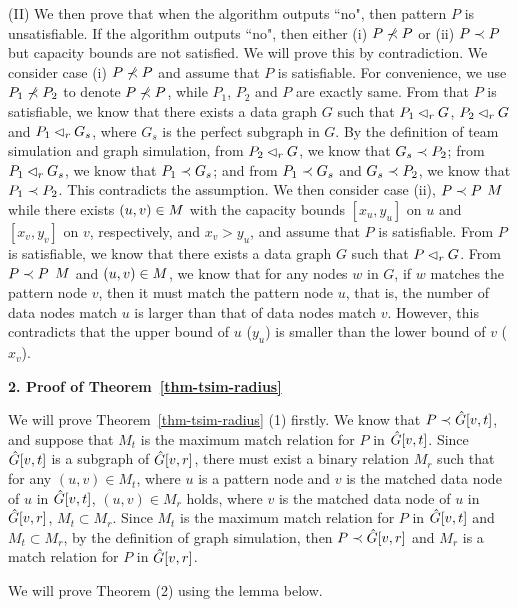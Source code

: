 \vspace{-1.5ex}
(II) We then prove that when the algorithm outputs ``no", then pattern $P$ is unsatisfiable.
If the algorithm outputs ``no", then either (i) $P \not\prec P$ or (ii) $P \prec P$ but capacity bounds are not satisfied.
We will prove this by contradiction.
We consider case (i) $P \not\prec P$ and assume that $P$ is satisfiable.
For convenience, we use $P_1 \not\prec P_2$ to denote $P \not\prec P$, while $P_1$, $P_2$ and $P$ are exactly same.
From that $P$ is satisfiable, we know that there exists a data graph $G$ such that $P_1 \lhd_r G$, $P_2 \lhd_r G$ and $P_1 \lhd_r G_s$, where $G_s$ is the perfect subgraph in $G$.
By the definition of team simulation and graph simulation, from $P_2 \lhd_r G$, we know that $G_s \prec P_2$;
from $P_1 \lhd_r G_s$, we know that $P_1 \prec G_s$; and 
from $P_1 \prec G_s$ and  $G_s \prec P_2$, we know that $P_1 \prec P_2$.
This contradicts the assumption.
We then consider case (ii), $P \prec P$ \wrt $M$ while there exists $(u, v)\in M$ with the capacity bounds $[x_u, y_u]$ on $u$ and $[x_v, y_v]$ on $v$, respectively, and $x_v > y_u$, and assume that $P$ is satisfiable.
From $P$ is satisfiable, we know that there exists a data graph $G$ such that $P \lhd_r G$.
From $P \prec P$ \wrt $M$ and $(u, v)\in M$, we know that for any nodes $w$ in $G$, if $w$ matches the pattern node $v$, then it must match the pattern node $u$, that is, the number of data nodes match $u$ is larger than that of data nodes match $v$.
However, this contradicts that the upper bound of $u$ ($y_u$) is smaller than the lower bound of $v$ ($x_v$).


\noindent
{\textbf{2. Proof of Theorem~\ref{thm-tsim-radius}}}

We will prove Theorem~\ref{thm-tsim-radius} (1) firstly.
We know that $P\prec \hat{G}{[v, t]}$, and suppose that $M_t$ is the maximum match relation for $P$ in $\hat{G}{[v, t]}$.
Since $\hat{G}{[v, t]}$ is a subgraph of $\hat{G}{[v, r]}$, 
there must exist a binary relation $M_r$ such that for any $(u, v) \in M_t$, where $u$ is a pattern node and $v$ is the matched data node of $u$ in $\hat{G}{[v, t]}$, 
$(u, v) \in M_r$ holds, where $v$ is the matched data node of $u$ in $\hat{G}{[v, r]}$, \ie $M_t \subset M_r$.
Since $M_t$ is the maximum match relation for $P$ in $\hat{G}{[v, t]}$ and $M_t \subset M_r$, by the definition of graph simulation, then $P\prec \hat{G}{[v, r]}$ and $M_r$ is a match relation for $P$ in $\hat{G}{[v, r]}$.	

\vspace{-1ex}	
We will prove Theorem (2) using the lemma below. 

